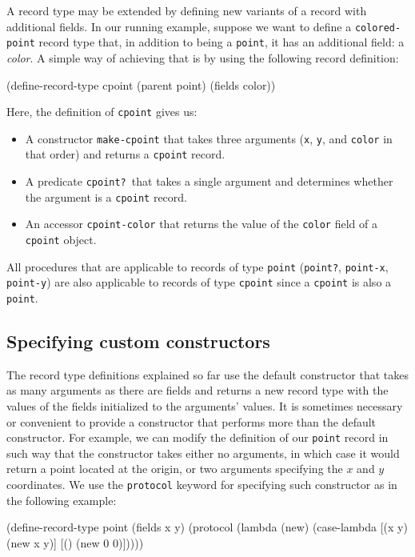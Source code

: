 \documentclass[onecolumn, 12pt, twoside, openright, dvipdfm]{book}
\begin{document}
A record type may be extended by defining new variants of a record
with additional fields.  In our running example, suppose we want
to define a \texttt{colored-point} record type that, in addition to
being a \texttt{point}, it has an additional field: a \emph{color}.
A simple way of achieving that is by using the following record 
definition:

\begin{CodeInline}
(define-record-type cpoint
  (parent point)
  (fields color))
\end{CodeInline}

Here, the definition of \texttt{cpoint} gives us:
\begin{itemize}
\item A constructor \texttt{make-cpoint} that takes three arguments
(\texttt{x}, \texttt{y}, and \texttt{color} in that order) and returns a
\texttt{cpoint} record.
\item A predicate \texttt{cpoint?}\ that takes a single argument and
determines whether the argument is a \texttt{cpoint} record.
\item An accessor \texttt{cpoint-color} that returns the value of
the \texttt{color} field of a \texttt{cpoint} object.
\end{itemize}

All procedures that are applicable to records of type
\texttt{point} (\texttt{point?}, \texttt{point-x},
\texttt{point-y}) are also applicable to records of type
\texttt{cpoint} since a \texttt{cpoint} is also a \texttt{point}.

\subsection{Specifying custom constructors}

The record type definitions explained so far use the default
constructor that takes as many arguments as there are fields and
returns a new record type with the values of the fields initialized
to the arguments' values.  It is sometimes necessary or convenient
to provide a constructor that performs more than the default
constructor.  For example, we can modify the definition of our
\texttt{point} record in such way that the constructor takes either
no arguments, in which case it would return a point located at the
origin, or two arguments specifying the $x$ and $y$ coordinates.  We
use the \texttt{protocol} keyword for specifying such constructor as
in the following example:

\begin{CodeInline}
(define-record-type point
  (fields x y)
  (protocol
    (lambda (new)
      (case-lambda
        [(x y) (new x y)]
        [()    (new 0 0)]))))
\end{CodeInline}
\end{document}
